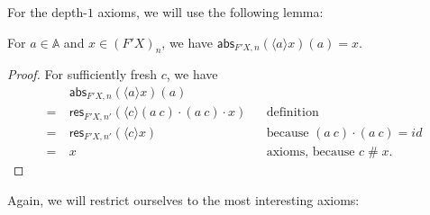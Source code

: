 \documentclass[a4paper,UKenglish,cleveref,thm-restate,numberwithinsect,final]{lipics-v2021}
\newcommand{\abs}{\mathsf{abs}}
\newcommand{\res}{\mathsf{res}}
\newcommand{\Names}{\mathbb{A}}
\newcommand{\fresh}{\mathbin{\#}}
\newcommand{\bind}[1]{\langle #1\rangle}
\theoremstyle{plain}
\newcommand{\id}{\mathit{id}}
\numberwithin{equation}{section}
\newcommand{\+}[1]{\mathcal{#1}\xspace}
\theoremstyle{definition}
\begin{document}
For the depth-$1$ axioms, we will use the following lemma:

\begin{lemma}\label{lem:abs-eq}
  For \(a \in \Names\) and \(x \in (F'X)_n\), we have \(\abs_{F'X, n}(\bind{a} x)(a) = x\).
\end{lemma}

\begin{proof}
  For sufficiently fresh \(c\), we have
  \begin{align*}
    &\abs_{F'X, n}(\bind{a} x)(a) \\
    =~&\res_{F'X, n'}(\bind{c}(a\ c) \cdot (a\ c) \cdot x) && \text{definition} \\
    =~&\res_{F'X, n'}(\bind{c} x) && \text{because } (a\ c) \cdot (a\ c) = \id \\
    =~&x && \text{axioms, because } c\fresh x.
  \end{align*}
\end{proof}

Again, we will restrict ourselves to the most interesting axioms:
\end{document}
